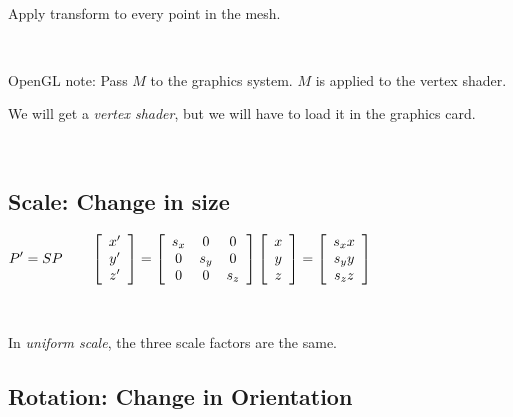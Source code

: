 \

Apply transform to every point in the mesh.  

\

OpenGL note:  Pass $M$ to the graphics system.  $M$ is applied to the vertex shader.  

We will get a {\it vertex shader}, but we will have to load it in the graphics card.  

\

\subsection{Scale:  Change in size}

$\displaystyle P' = SP
\qquad
\left[
\begin{array}{c}
	x' \cr
	y' \cr
	z' \cr
\end{array}
\right] 
= 
\left[
\begin{array}{ccc}
	s_x & 0 & 0 \cr
	0 & s_y & 0 \cr
	0 & 0 & s_z \cr	
\end{array}
\right] 
\left[
\begin{array}{c}
	x \cr
	y \cr
	z \cr	
\end{array}
\right] 
=
\left[
\begin{array}{c}
	s_x x \cr
	s_y y \cr
	s_z z \cr	
\end{array}
\right] 
$

\

In {\it uniform scale}, the three scale factors are the same.  

\vskip -1in
\hfill{}

\subsection{Rotation:  Change in Orientation}

